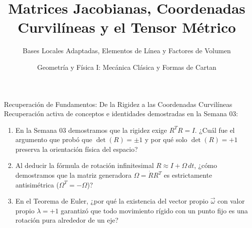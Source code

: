 \documentclass[10pt,aspectratio=169]{beamer}
\title[Semana 4: Jacobianas y Métrica]{Matrices Jacobianas, Coordenadas Curvilíneas y el Tensor Métrico}
\subtitle{Bases Locales Adaptadas, Elementos de Línea y Factores de Volumen}
\author{Geometría y Física I: Mecánica Clásica y Formas de Cartan}
\institute{}
\date{}
\begin{document}
\setlength{\abovedisplayskip}{3pt}
\setlength{\belowdisplayskip}{3pt}

\begin{frame}
  \titlepage
\end{frame}

\begin{frame}{Recuperación de Fundamentos: De la Rigidez a las Coordenadas Curvilíneas}
  \vspace{0.1cm}
  Recuperación activa de conceptos e identidades demostradas en la Semana 03:
  \vspace{0.3cm}
  \begin{enumerate}\itemsep14pt
    \item En la Semana 03 demostramos que la rigidez exige $R^T R = I$. ¿Cuál fue el argumento que probó que $\det(R) = \pm 1$ y por qué solo $\det(R) = +1$ preserva la orientación física del espacio?
    \item Al deducir la fórmula de rotación infinitesimal $R \approx I + \Omega\,dt$, ¿cómo demostramos que la matriz generadora $\Omega = \dot{R}R^T$ es estrictamente antisimétrica ($\Omega^T = -\Omega$)?
    \item En el Teorema de Euler, ¿por qué la existencia del vector propio $\vec{\omega}$ con valor propio $\lambda = +1$ garantizó que todo movimiento rígido con un punto fijo es una rotación pura alrededor de un eje?
  \end{enumerate}
\end{frame}
\end{document}
